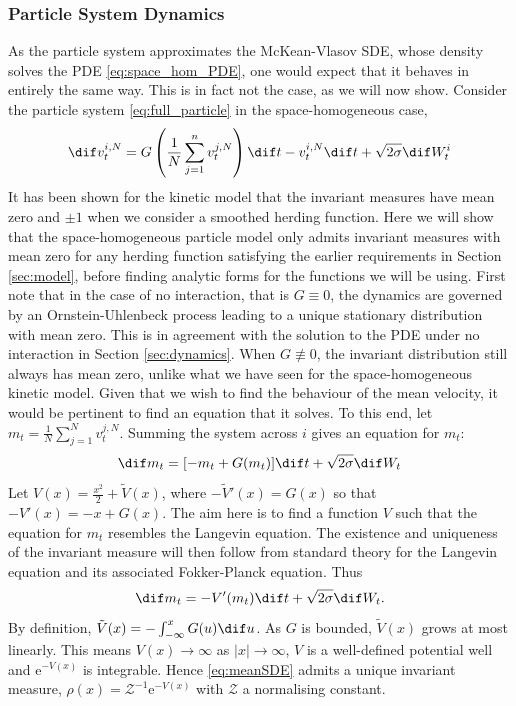\documentclass[11pt, a4paper, draft]{article}
\begin{document}
    \subsubsection{Particle System Dynamics}
        As the particle system approximates the McKean-Vlasov SDE, whose density solves the PDE \eqref{eq:space_hom_PDE}, one would expect that it behaves in entirely the same way. This is in fact not the case, as we will now show. Consider the particle system \eqref{eq:full_particle} in the space-homogeneous case,
        \begin{equation}\label{eq:hom_particle}
            \dif v^{i,N}_t = G\left(\frac{1}{N}\sum_{j=1}^n v^{j,N}_t\right)\dif t-v^{i,N}_t \dif t + \sqrt{2\sigma} \dif W^i_t
        \end{equation}
        It has been shown for the kinetic model that the invariant measures have mean zero and $\pm 1$ when we consider a smoothed herding function. Here we will show that the space-homogeneous particle model only admits invariant measures with mean zero for any herding function satisfying the earlier requirements in Section \ref{sec:model}, before finding analytic forms for the functions we will be using. First note that in the case of no interaction, that is $G\equiv 0$, the dynamics are governed by an Ornstein-Uhlenbeck process leading to a unique stationary distribution with mean zero. This is in agreement with the solution to the PDE under no interaction in Section \ref{sec:dynamics}. When $G\not\equiv 0$, the invariant distribution still always has mean zero, unlike what we have seen for the space-homogeneous kinetic model. Given that we wish to find the behaviour of the mean velocity, it would be pertinent to find an equation that it solves. To this end, let $m_t = \frac{1}{N}\sum_{j=1}^N v^{j,N}_t$. Summing the system across $i$ gives an equation for $m_t$:
        \[
            \dif m_t = \lbrack -m_t + G(m_t)\rbrack \dif t +\sqrt{2\sigma}\dif W_t
        \]
        Let $V(x) = \frac{x^2}{2} + \tilde{V}(x)$, where $-\tilde{V}'(x) = G(x)$ so that $-V'(x) = -x + G(x)$. The aim here is to find a function $V$ such that the equation for $m_t$ resembles the Langevin equation. The existence and uniqueness of the invariant measure will then follow from standard theory for the Langevin equation and its associated Fokker-Planck equation. Thus
        \begin{equation}\label{eq:meanSDE}
            \dif m_t = -V'(m_t)\dif t + \sqrt{2\sigma}\dif W_t.
        \end{equation}    
        By definition, $\tilde{V}(x) = - \int_{-\infty}^x G(u) \dif u$. As $G$ is bounded, $\tilde{V}(x)$ grows at most linearly. This means $V(x) \to \infty$ as $|x|\to \infty$, $V$ is a well-defined potential well and $\mathrm{e}^{-V(x)}$ is integrable. Hence \eqref{eq:meanSDE} admits a unique invariant measure, $\rho(x) = \mathcal{Z}^{-1}\mathrm{e}^{-V(x)}$ with $\mathcal{Z}$ a normalising constant.
        
\end{document}
